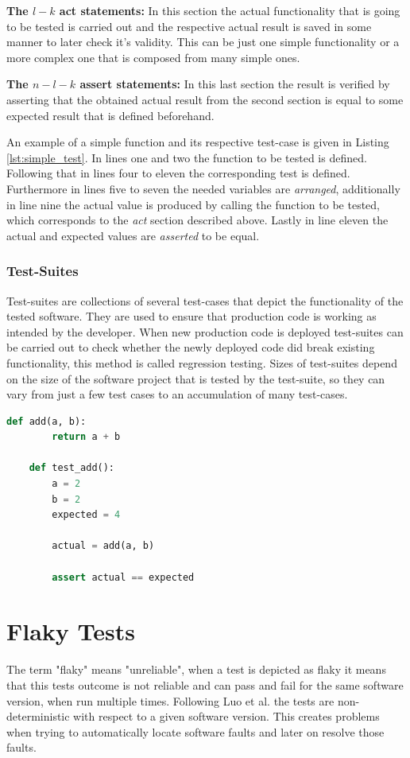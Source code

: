 \documentclass[
fancyheadings, %
%
%
]{stsreprt}
\begin{document}
\textbf{The $l-k$ act statements:} In this section the actual functionality that is going to be tested is carried out and the respective actual result is saved in some manner to later check it's validity. This can be just one simple functionality or a more complex one that is composed from many simple ones. \par
\textbf{The $n-l-k$ assert statements:} In this last section the result is verified by asserting that the obtained actual result from the second section is equal to some expected result that is defined beforehand. \par
An example of a simple function and its respective test-case is given in Listing \ref{lst:simple_test}. 
In lines one and two the function to be tested is defined. 
Following that in  lines four to eleven the corresponding test is defined.
Furthermore in lines five to seven the needed variables are \textit{arranged}, additionally in line nine the actual value is produced by calling the function to be tested, which corresponds to the \textit{act} section described above. 
Lastly in line eleven the actual and expected values are \textit{asserted} to be equal. 

\subsubsection{Test-Suites}
Test-suites are collections of several test-cases that depict the functionality of the tested software. They are used to ensure that production code is working as intended by the developer. When new production code is deployed test-suites can be carried out to check whether the newly deployed code did break existing functionality, this method is called regression testing. Sizes of test-suites depend on the size of the software project that is tested by the test-suite, so they can vary from just a few test cases to an accumulation of many test-cases.

\begin{lstlisting}[language=Python, caption={A simple function and it's respecive test-case }, label=lst:simple_test]
    def add(a, b):
        return a + b

    def test_add():
        a = 2
        b = 2
        expected = 4

        actual = add(a, b)

        assert actual == expected
\end{lstlisting}

\section{Flaky Tests}
The term "flaky" means "unreliable", when a test is depicted as flaky it means that this tests outcome is not reliable and can pass and fail for the same software version, when run multiple times. 
Following Luo et al. \cite{luo:2014} the tests are non-deterministic with respect to a given software version. 
This creates problems when trying to automatically locate software faults and later on resolve those faults. \par
\end{document}

